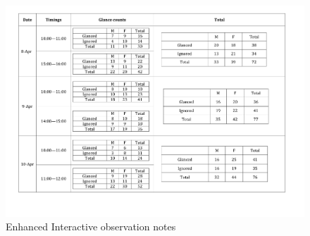 \begin{appendices}
\begin{figure}[H]
 \centering 
    \includegraphics[width=\textwidth,height=0.5\textheight]{Appendices/9/new_body_glance.pdf}
    \caption{Enhanced Interactive observation notes}
     \label{app:fileandfolders}%
\end{figure}


\end{appendices}

